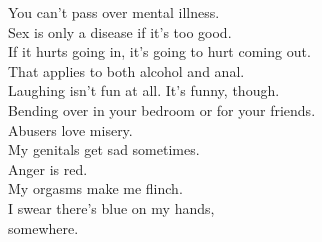 You can't pass over mental illness.\\
Sex is only a disease if it's too good.\\
If it hurts going in, it's going to hurt coming out.\\
That applies to both alcohol and anal.\\
Laughing isn't fun at all. It's funny, though.\\
Bending over in your bedroom or for your friends.\\
Abusers love misery.\\
My genitals get sad sometimes.\\
Anger is red.\\
My orgasms make me flinch.\\
I swear there's blue on my hands,\\
somewhere.\\

